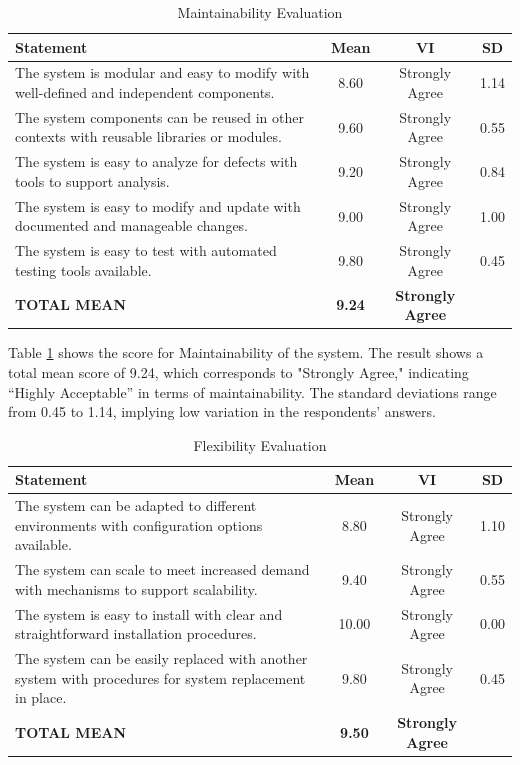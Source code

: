 	\begin{table}[h!]
		\centering
		\caption{Maintainability Evaluation}
		\label{mntnblty}
		\renewcommand{\arraystretch}{1.2}
		\begin{tabularx}{\linewidth}{|X|c|c|c|}
			\hline
			\textbf{Statement} & \textbf{Mean} & \textbf{VI} & \textbf{SD} \\ \hline
			The system is modular and easy to modify with well-defined and independent components.
			& 8.60 & Strongly Agree & 1.14 \\ \hline
			The system components can be reused in other contexts with reusable libraries or modules.
			& 9.60 & Strongly Agree & 0.55 \\ \hline
			The system is easy to analyze for defects with tools to support analysis.
			& 9.20 & Strongly Agree & 0.84 \\ \hline
			The system is easy to modify and update with documented and manageable changes.
			& 9.00 & Strongly Agree & 1.00 \\ \hline
			The system is easy to test with automated testing tools available.
			& 9.80 & Strongly Agree & 0.45 \\ \hline
			\textbf{TOTAL MEAN} & \textbf{9.24} & \textbf{Strongly Agree} & \\ \hline
		\end{tabularx}
	\end{table}
	
	Table \ref{mntnblty} shows the score for Maintainability of the system. The result shows a total mean score of 9.24, which corresponds to "Strongly Agree," indicating “Highly Acceptable” in terms of maintainability. The standard deviations range from 0.45 to 1.14, implying low variation in the respondents’ answers.
	
	\begin{table}[h!]
		\centering
		\caption{Flexibility Evaluation}
		\label{flxblty}
		\renewcommand{\arraystretch}{1.2}
		\begin{tabularx}{\linewidth}{|X|c|c|c|}
			\hline
			\textbf{Statement} & \textbf{Mean} & \textbf{VI} & \textbf{SD} \\ \hline
			The system can be adapted to different environments with configuration options available.
			& 8.80 & Strongly Agree & 1.10 \\ \hline
			The system can scale to meet increased demand with mechanisms to support scalability.
			& 9.40 & Strongly Agree & 0.55 \\ \hline
			The system is easy to install with clear and straightforward installation procedures.
			& 10.00 & Strongly Agree & 0.00 \\ \hline
			The system can be easily replaced with another system with procedures for system replacement in place.
			& 9.80 & Strongly Agree & 0.45 \\ \hline
			\textbf{TOTAL MEAN} & \textbf{9.50} & \textbf{Strongly Agree} & \\ \hline
		\end{tabularx}
	\end{table}
	

